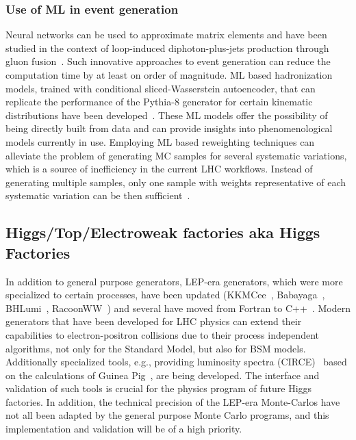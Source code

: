 \documentclass[10pt,a4paper]{article}
\begin{document}
\subsubsection{Use of ML in event generation}
\label{use-of-ml-in-event-generation}

Neural networks can be used to approximate matrix elements and have been
studied in the context of loop-induced diphoton-plus-jets production
through gluon
fusion~\cite{Moodie:2022flt}. Such
innovative approaches to event generation can reduce the computation
time by at least on order of magnitude. ML based hadronization models,
trained with conditional sliced-Wasserstein autoencoder, that can
replicate the performance of the Pythia-8 generator for certain
kinematic distributions have been
developed~\cite{Ilten:2022jfm,
Bierlich:2023fmh}. These ML models offer the possibility of being
directly built from data and can provide insights into phenomenological
models currently in use. Employing ML based reweighting techniques can
alleviate the problem of generating MC samples for several systematic
variations, which is a source of inefficiency in the current LHC
workflows. Instead of generating multiple samples, only one sample with
weights representative of each systematic variation can be then
sufficient~\cite{CMS:2024jdl}.

\subsection{Higgs/Top/Electroweak factories aka Higgs
Factories}\label{higgstopelectroweak-factories-aka-higgs-factories}

In addition to general purpose generators, LEP-era generators, which
were more specialized to certain processes, have been updated
(KKMCee~\cite{Jadach:1999vf},
Babayaga~\cite{CarloniCalame:2003yt},
BHLumi~\cite{Jadach:1991by},
RacoonWW~\cite{Denner:2000bj}) and several
have moved from Fortran to
C++~\cite{Jadach:2022mbe}. Modern
generators that have been developed for LHC physics can extend their
capabilities to electron-positron collisions due to their process
independent algorithms, not only for the Standard Model, but also for
BSM models. Additionally specialized tools, e.g., providing luminosity
spectra (CIRCE)~\cite{Ohl:1996fi}
based on the calculations of Guinea
Pig~\cite{Schulte:1998au}, are being
developed. The interface and validation of such tools is crucial for the
physics program of future Higgs factories. In addition, the technical
precision of the LEP-era Monte-Carlos have not all been
adapted by the general purpose Monte Carlo programs, and this
implementation and validation will be of a high priority.
\end{document}
